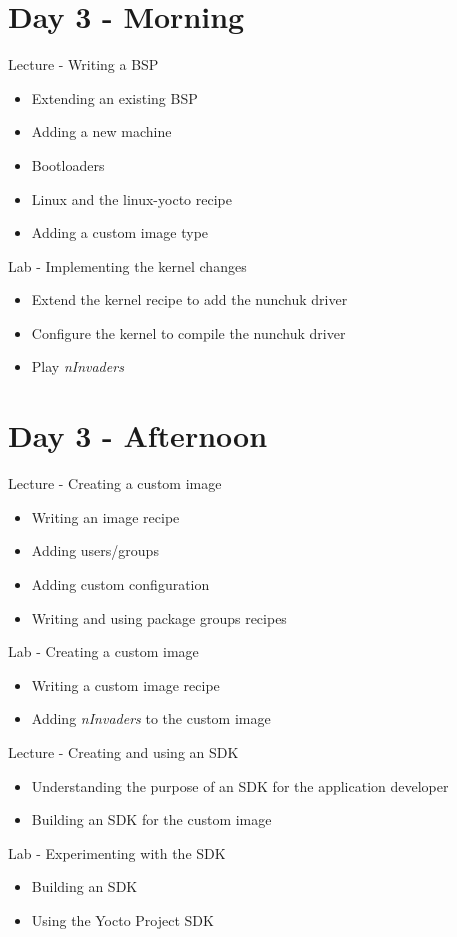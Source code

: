 \documentclass[a4paper,12pt,obeyspaces,spaces,hyphens]{article}
\begin{document}
\section{Day 3 - Morning}

\feagendatwocolumn
{Lecture - Writing a BSP}
{
  \begin{itemize}
  \item Extending an existing BSP
  \item Adding a new machine
  \item Bootloaders
  \item Linux and the linux-yocto recipe
  \item Adding a custom image type
  \end{itemize}
}
{Lab - Implementing the kernel changes}
{
  \begin{itemize}
  \item Extend the kernel recipe to add the nunchuk driver
  \item Configure the kernel to compile the nunchuk driver
  \item Play {\em nInvaders}
  \end{itemize}
}

\section{Day 3 - Afternoon}

\feagendatwocolumn
{Lecture - Creating a custom image}
{
  \begin{itemize}
  \item Writing an image recipe
  \item Adding users/groups
  \item Adding custom configuration
  \item Writing and using package groups recipes
  \end{itemize}
}
{Lab - Creating a custom image}
{
  \begin{itemize}
  \item Writing a custom image recipe
  \item Adding {\em nInvaders} to the custom image
  \end{itemize}
}
\feagendatwocolumn
{Lecture - Creating and using an SDK}
{
  \begin{itemize}
  \item Understanding the purpose of an SDK for the application
    developer
  \item Building an SDK for the custom image
  \end{itemize}
}
{Lab - Experimenting with the SDK}
{
  \begin{itemize}
  \item Building an SDK
  \item Using the Yocto Project SDK
  \end{itemize}
}
\end{document}
